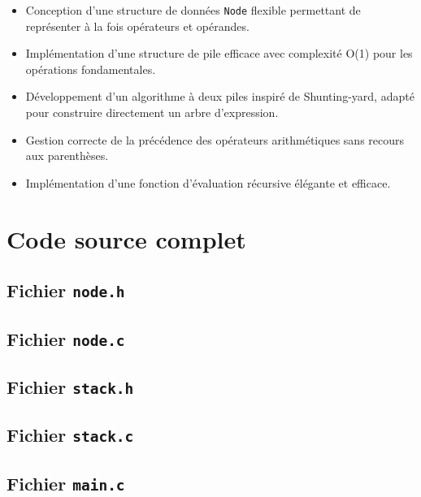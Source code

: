 \documentclass[12pt,a4paper]{article}
\begin{document}
\begin{itemize}
    \item Conception d'une structure de données \texttt{Node} flexible permettant de représenter à la fois opérateurs et opérandes.
    \item Implémentation d'une structure de pile efficace avec complexité O(1) pour les opérations fondamentales.
    \item Développement d'un algorithme à deux piles inspiré de Shunting-yard, adapté pour construire directement un arbre d'expression.
    \item Gestion correcte de la précédence des opérateurs arithmétiques sans recours aux parenthèses.
    \item Implémentation d'une fonction d'évaluation récursive élégante et efficace.
\end{itemize}

\newpage
\appendix

\section{Code source complet}

\subsection{Fichier \texttt{node.h}}


\subsection{Fichier \texttt{node.c}}


\subsection{Fichier \texttt{stack.h}}


\subsection{Fichier \texttt{stack.c}}


\subsection{Fichier \texttt{main.c}}

\end{document}
